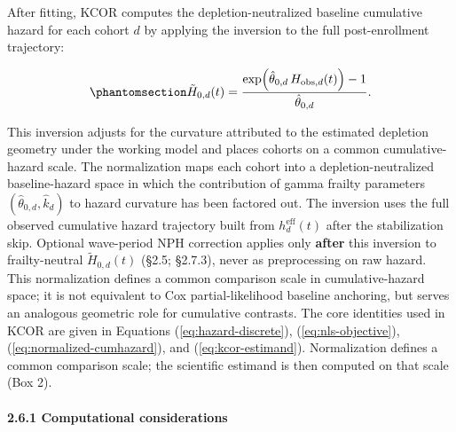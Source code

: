 \documentclass[
]{article}
\begin{document}
After fitting, KCOR computes the depletion-neutralized baseline cumulative hazard for each cohort \(d\) by applying the inversion to the full post-enrollment trajectory:

\begin{equation}\protect\phantomsection\label{eq:normalized-cumhazard}{\tilde H_{0,d}(t) = \frac{\exp\!\left(\hat{\theta}_{0,d}\,H_{\mathrm{obs},d}(t)\right)-1}{\hat{\theta}_{0,d}}.}\end{equation}

This inversion adjusts for the curvature attributed to the estimated depletion geometry under the working model and places cohorts on a common cumulative-hazard scale. The normalization maps each cohort into a depletion-neutralized baseline-hazard space in which the contribution of gamma frailty parameters \((\hat{\theta}_{0,d}, \hat{k}_d)\) to hazard curvature has been factored out. The inversion uses the full observed cumulative hazard trajectory built from \(h_d^{\mathrm{eff}}(t)\) after the stabilization skip. Optional wave-period NPH correction applies only \textbf{after} this inversion to frailty-neutral \(\tilde H_{0,d}(t)\) (§2.5; §2.7.3), never as preprocessing on raw hazard. This normalization defines a common comparison scale in cumulative-hazard space; it is not equivalent to Cox partial-likelihood baseline anchoring, but serves an analogous geometric role for cumulative contrasts. The core identities used in KCOR are given in Equations (\ref{eq:hazard-discrete}), (\ref{eq:nls-objective}), (\ref{eq:normalized-cumhazard}), and (\ref{eq:kcor-estimand}). Normalization defines a common comparison scale; the scientific estimand is then computed on that scale (Box 2).

\paragraph{2.6.1 Computational considerations}\label{computational-considerations}
\end{document}
